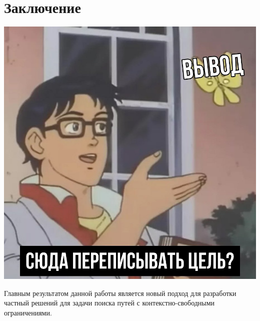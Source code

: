 \section*{Заключение}

\includegraphics[width=0.75\linewidth]{img/conclusion_goal}

Главным результатом данной работы является новый подход для разработки частный решений для задачи поиска путей с контекстно-свободными ограничениями.